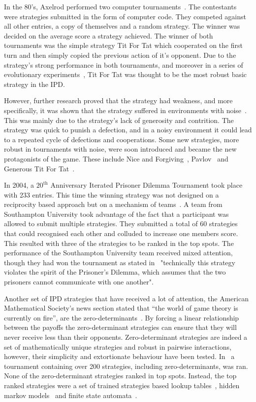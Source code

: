 \documentclass{article}
\begin{document}
In the 80's, Axelrod performed two computer tournaments~\cite{Axelrod1980a,
Axelrod1980b}. The contestants were strategies submitted in the form of computer
code. They competed against all other entries, a copy of themselves and a random
strategy. The winner was decided on the average score a strategy achieved. The
winner of both tournaments was the simple strategy Tit For Tat which cooperated
on the first turn and then simply copied the previous action of it's opponent.
Due to the strategy's strong performance in both tournaments, and moreover in a
series of evolutionary experiments~\cite{Axelrod1981}, Tit For Tat was thought
to be the most robust basic strategy in the IPD.

However, further research proved that the strategy had weakness, and more
specifically, it was shown that the strategy suffered in environments with
noise~\cite{Bendor1991, Donninger1986, Molander1985, Hammerstein1984}. This was
mainly due to the strategy's lack of generosity and contrition. The strategy was
quick to punish a defection, and in a noisy environment it could lead to a
repeated cycle of defections and cooperations. Some new strategies, more
robust in tournaments with noise, were soon introduced and became the new
protagonists of the game. These include Nice and Forgiving~\cite{Bendor1991},
Pavlov~\cite{Nowak1993} and Generous Tit For Tat~\cite{Nowak1992}.

In 2004, a $20^{\text{th}}$ Anniversary Iterated Prisoner Dilemma Tournament
took place with 233 entries. This time the winning strategy was not designed on
a reciprocity based approach but on a mechanism of
teams~\cite{J.P.Delahaye1993Lp, J.P.Delahaye1995LIeP, A.Rogers2007Ctpw}. A team
from Southampton University took advantage of the fact that a participant was
allowed to submit multiple strategies. They submitted a total of 60 strategies
that could recognised each other and colluded to increase one members score.
This resulted with three of the strategies to be ranked in the top spots. The
performance of the Southampton University team received mixed attention, though
they had won the tournament as stated in~\cite{us_blog} "technically this
strategy violates the spirit of the Prisoner's Dilemma, which assumes that the
two prisoners cannot communicate with one another".

Another set of IPD strategies that have received a lot of attention, the
American Mathematical Society's news section stated that ``the world of game
theory is currently on fire'', are the zero-determinants~\cite{Press2012}. By
forcing a linear relationship between the payoffs the zero-determinant
strategies can ensure that they will never receive less than their opponents.
Zero-determinant strategies are indeed a set of mathematically unique strategies
and robust in pairwise interactions, however, their simplicity and extortionate
behaviour have been tested. In~\cite{Harper2017} a tournament containing over
200 strategies, including zero-determinants, was ran. None of the zero-determinant
strategies ranked in top spots. Instead, the top ranked strategies were a set of
trained strategies based lookup tables~\cite{Axelrod1987}, hidden markov
models~\cite{Harper2017} and finite state automata~\cite{Miller1996}.
\end{document}

